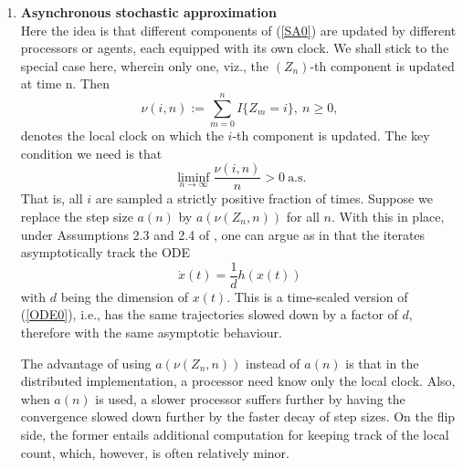 \documentclass[12pt]{article}
\numberwithin{equation}{section}
\newcommand{\R}{\mathcal{R}}
\newcommand{\1}{\textbf{1}}
\begin{document}
\begin{enumerate}
Treating $\{a(n)\}$ as the base step size sequence, (\ref{SAslow}) can be rewritten as
$$y(n+1) = y(n) + a(n)\left[\left(\frac{b(n)}{a(n)}\right)g(x(n),y(n)) + \varepsilon_2(n+1) + M_2(n+1)\right].$$
Since $\frac{b(n)}{a(n)} \to 0$, the ODE that will be tracked then is
$$\dot{x}(t) = h(x(t), y(t)), \ \dot{y}(t) = 0.$$
That is, $\bar{x}(t), t \in [s,s+T],$ tracks the ODE (in the sense of (\ref{ODElim}) ) given by
$$\dot{x}^s(t) = h(x^s(t), y^s(s)).$$
Suppose the ODE
$$\dot{x}(t) = h(x(t),y)$$
with $y$ treated as a constant parameter, has a unique asymptotically stable equilibrium $\kappa(y)$ for some Lipschitz $\kappa : \R^s \to \R^d$. Then a technical argument similar to that for (\ref{SA0}) above leads to $$x(n) - \kappa(y(n)) \to 0 \ \mbox{a.s.}$$
Then (\ref{SAslow}) can be rewritten as
\begin{eqnarray*}
y(n+1) &=& y(n) + b(n)\Bigg[g(\kappa(y(n)),y(n)) \nonumber \\
&& \ \ \ \ \ \ \ \ \ \ \ + \ \tilde{\varepsilon}_2(n+1) + M_2(n+1)\Bigg],
\end{eqnarray*}
where
$$\tilde{\varepsilon}_2(n+1) := \varepsilon_2(n+1) + g(x(n), y(n)) - g(\kappa(y(n)), y(n)) \to 0 \ \mbox{a.s.}$$
Suppose the ODE
$$\dot{y}(t) = g(\kappa(y(t)), y(t))$$
has a unique asymptotically stable equilibrium $y^*$. Then by familiar arguments, $y(n) \to y^*$ a.s. Then $x(n) \to \kappa(y^*)$ a.s.

\item \textbf{Asynchronous stochastic approximation}\\

Here the idea is that different components of (\ref{SA0}) are updated by different processors or agents, each equipped with its own clock. We shall stick to the special case here, wherein only one, viz., the $(Z_n)$-th component is  updated at time n. Then
$$\nu(i,n) := \sum_{m=0}^nI\{Z_m = i\}, \ n \geq 0,$$
denotes the local clock on which the $i$-th component is updated. The key condition we need is that
$$\liminf_{n\to\infty}\frac{\nu(i,n)}{n} > 0 \ \mbox{a.s.}$$
That is, all $i$ are sampled a strictly positive fraction of times. Suppose we replace the step size $a(n)$ by $a(\nu(Z_n,n))$ for all $n$. With this in place, under Assumptions 2.3 and 2.4 of \cite{Abounadi}, one can argue as in \cite{Abounadi} that the iterates asymptotically track the ODE
$$\dot{x}(t) = \frac{1}{d}h(x(t))$$
with $d$ being the dimension of $x(t)$.
This is a time-scaled version of (\ref{ODE0}), i.e., has the same trajectories slowed down by a factor of $d$, therefore with the same asymptotic behaviour. 

The advantage of using $a(\nu(Z_n,n))$ instead of $a(n)$ is that in the distributed implementation, a processor need know only the local clock. Also, when $a(n)$ is used, a slower processor suffers further by having the convergence slowed down further by the faster decay of step sizes. On the flip side, the former entails additional computation for keeping track of the local count, which, however, is often relatively minor.

\end{enumerate}
\end{document}
